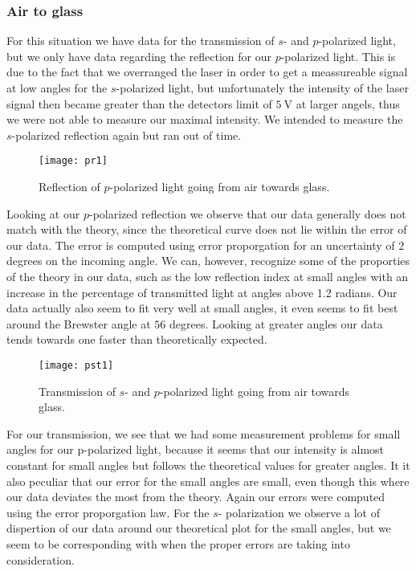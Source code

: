 \subsubsection{Air to glass}
For this situation we have data for the transmission of $s$- and $p$-polarized light, but we only have data regarding the reflection for our $p$-polarized light. This is due to the fact that we overranged the laser in order to get a meassureable signal at low angles for the $s$-polarized light, but unfortunately the intensity of the laser signal then became greater than the detectors limit of $\SI{5}{\volt}$ at larger angels, thus we were not able to measure our maximal intensity. We intended to measure the $s$-polarized reflection again but ran out of time.\\

\begin{figure}[h!]
    \centering
    \texttt{[image: pr1]}
    \caption{Reflection of $p$-polarized light going from air towards glass.}
    \label{fig:pr1}
\end{figure}

Looking at our $p$-polarized reflection we observe that our data generally does not match with the theory, since the theoretical curve does not lie within the error of our data. The error is computed using error proporgation for an uncertainty of 2 degrees on the incoming angle. We can, however, recognize some of the proporties of the theory in our data, such as the low reflection index at small angles with an increase in the percentage of transmitted light at angles above 1.2 radians. Our data actually also seem to fit very well at small angles, it even seems to fit best around the Brewster angle at $56$ degrees. Looking at greater angles our data tends towards one faster than theoretically expected. 

\begin{figure}[h!]
    \centering
    \texttt{[image: pst1]}
    \caption{Transmission of $s$- and $p$-polarized light going from air towards glass.}
    \label{fig:pst1}
\end{figure}
\noindent
For our transmission, we see that we had some measurement problems for small angles for our p-polarized light, because it seems that our intensity is almost constant for small angles but follows the theoretical values for greater angles. It it also peculiar that our error for the small angles are small, even though this where our data deviates the most from the theory. Again our errors were computed using the error proporgation law. For the $s$- polarization we observe a lot of dispertion of our data around our theoretical plot for the small angles, but we seem to be corresponding with when the proper errors are taking into consideration.

